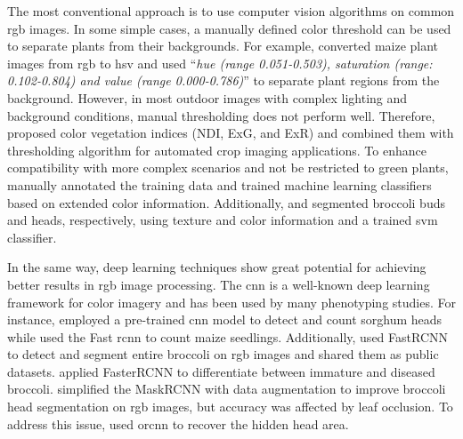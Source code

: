 
The most conventional approach is to use computer vision algorithms on common \gls{rgb} images. In some simple cases, a manually defined color threshold can be used to separate plants from their backgrounds. For example, \citet{choudhury_holistic_2018} converted maize plant images from \gls{rgb} to \gls{hsv} and used ``\textit{hue (range 0.051-0.503), saturation (range: 0.102-0.804) and value (range 0.000-0.786)}'' to separate plant regions from the background. However, in most outdoor images with complex lighting and background conditions, manual thresholding does not perform well. Therefore, \citet{meyer_verification_2008} proposed color vegetation indices (NDI, ExG, and ExR) and combined them with \citet{otsu_threshold_1979} thresholding algorithm for automated crop imaging applications. To enhance compatibility with more complex scenarios and not be restricted to green plants, \citet{guo_easypcc_2017}  manually annotated the training data and trained machine learning classifiers based on extended color information. Additionally, \citet{zou_broccoli_2019} and \citet{blok_machine_2016} segmented broccoli buds and heads, respectively, using texture and color information and a trained \gls{svm} classifier.

In the same way, deep learning techniques show great potential for achieving better results in \gls{rgb} image processing. The \gls{cnn} is a well-known deep learning framework for color imagery and has been used by many phenotyping studies. For instance, \citet{ghosal_weakly_2019} employed a pre-trained \gls{cnn} model to detect and count sorghum heads while \citet{liu_estimating_2022} used the Fast \gls{rcnn} to count maize seedlings. Additionally, \citet{bender_high_2020} used FastRCNN to detect and segment entire broccoli on \gls{rgb} images and shared them as public datasets. \citet{garcia_towards_2021} applied FasterRCNN to differentiate between immature and diseased broccoli. \citet{blok_effect_2021} simplified the MaskRCNN with data augmentation to improve broccoli head segmentation on \gls{rgb} images, but accuracy was affected by leaf occlusion. To address this issue, \citet{blok_image_2021} used \gls{orcnn} to recover the hidden head area.


